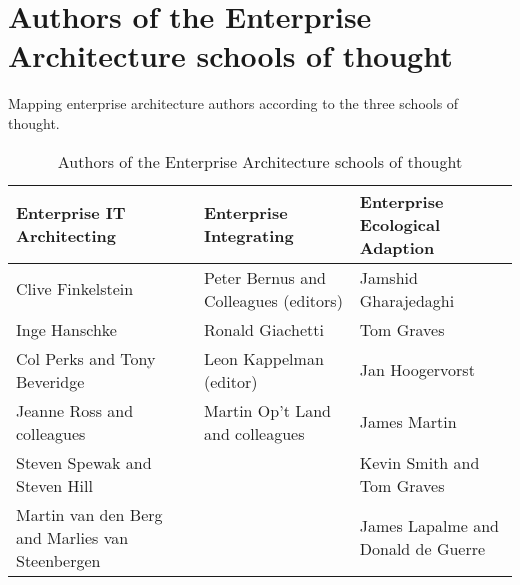 \chapter{Authors of the Enterprise Architecture schools of thought}
\label{app:easchoolsresearchers}

\textcite[p. 42]{Lapalme2012} Mapping enterprise architecture authors according to the three schools of thought.
\begin{small}
\begin{longtable}{p{}p{}p{}}
	\toprule
	\textbf{Enterprise IT Architecting}	& \textbf{Enterprise Integrating} & \textbf{Enterprise Ecological Adaption} \\ \midrule%
	\endhead%
	\hline
	\caption{Authors of the Enterprise Architecture schools of thought \parencite[p. 42]{Lapalme2012}}
	\label{tab:easchoolresearchers}	
	\endfoot%
	Clive Finkelstein				&		Peter Bernus and Colleagues (editors)	&		Jamshid Gharajedaghi \\
	Inge Hanschke					&		Ronald Giachetti						&		Tom Graves \\
	Col Perks and Tony Beveridge	&		Leon Kappelman (editor)					&		Jan Hoogervorst \\
	Jeanne Ross and colleagues		&		Martin Op't Land and colleagues			&		James Martin \\
	Steven Spewak and Steven Hill	&												&		Kevin Smith and Tom Graves \\
	Martin van den Berg and Marlies van Steenbergen & 								&		James Lapalme and Donald de Guerre \\
	\bottomrule
\end{longtable}
\end{small}